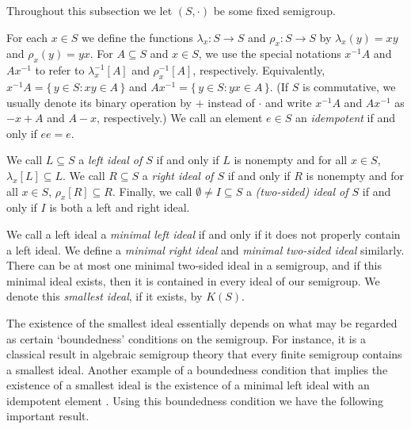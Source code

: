 Throughout this subsection we let $(S, \cdot)$ be some fixed semigroup. 

For each $x \in S$ we define the functions $\lambda_x \colon S \to S$ and $\rho_x \colon S \to S$ by $\lambda_x(y) = xy$ and $\rho_x(y) = yx$. 
For $A \subseteq S$ and $x \in S$, we use the special notations $x^{-1}A$ and $Ax^{-1}$ to refer to $\lambda_x^{-1}[A]$ and $\rho_x^{-1}[A]$, respectively. 
Equivalently, $x^{-1}A = \{\, y \in S : xy \in A \,\}$ and $Ax^{-1} = \{\, y \in S : yx \in A \,\}$.
(If $S$ is commutative, we usually denote its binary operation by $+$ instead of $\cdot$ and write $x^{-1}A$ and $Ax^{-1}$ as $-x+A$ and $A-x$, respectively.)
We call an element $e \in S$ an \emph{idempotent} if and only if $ee = e$.

We call $L \subseteq S$ a \emph{left ideal of $S$} if and only if $L$ is nonempty and for all $x \in S$, $\lambda_x[L] \subseteq L$. 
We call $R \subseteq S$ a \emph{right ideal of $S$} if and only if $R$ is nonempty and for all $x \in S$, $\rho_x[R] \subseteq R$. 
Finally, we call $\emptyset \ne I \subseteq S$ a \emph{(two-sided) ideal of $S$} if and only if $I$ is both a left and right ideal.

We call a left ideal a \emph{minimal left ideal} if and only if it does not properly contain a left ideal.
We define a \emph{minimal right ideal} and \emph{minimal two-sided ideal} similarly.
There can be at most one minimal two-sided ideal in a semigroup, and if this minimal ideal exists, then it is contained in every ideal of our semigroup.
We denote this \emph{smallest ideal}, if it exists, by $K(S)$.%

The existence of the smallest ideal essentially depends on what may be regarded as certain `boundedness' conditions on the semigroup.
For instance, it is a classical result in algebraic semigroup theory that every finite semigroup contains a smallest ideal.
Another example of a boundedness condition that implies the existence of a smallest ideal is the existence of a minimal left ideal with an idempotent element \cite[Theorem 1.59]{Hindman:1998fk}. 
Using this boundedness condition we have the following important result.

